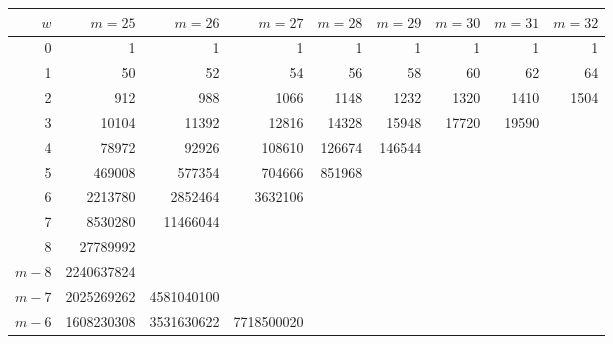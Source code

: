\documentclass[journal, twocol]{IEEEtran}
\begin{document}
\begin{table}
\centering
\footnotesize
\begin{tabular}{|@{\hskip.08cm}r@{\hskip.08cm}||@{\hskip.08cm}r@{\hskip.08cm}|@{\hskip.08cm}r@{\hskip.08cm}|@{\hskip.08cm}r@{\hskip.08cm}|@{\hskip.08cm}r@{\hskip.08cm}|@{\hskip.08cm}r@{\hskip.08cm}|@{\hskip.08cm}r@{\hskip.08cm}|@{\hskip.08cm}r@{\hskip.08cm}|@{\hskip.08cm}r@{\hskip.08cm}|}
\hline
$w$        &$m=25$      & $m=26$     & $m=27$     & $m=28$      & $m=29$      & $m=30$      & $m=31$      & $m=32$     \\\hline\hline
0          & 1          & 1          & 1          & 1           & 1           & 1           & 1           & 1          \\\hline
1          & 50         & 52         & 54         & 56          & 58          & 60          & 62          & 64         \\\hline
2          & 912        & 988        & 1066       & 1148        & 1232        & 1320        & 1410        & 1504       \\\hline
3          & 10104      & 11392      & 12816      & 14328       & 15948       & 17720       & 19590       &            \\\hline
4          & 78972      & 92926      & 108610     & 126674      & 146544      &             &             &            \\\hline
5          & 469008     & 577354     & 704666     & 851968      &             &             &             &             \\\hline
6          & 2213780    & 2852464    & 3632106    &             &             &             &             &             \\\hline
7          & 8530280    & 11466044   &            &             &             &             &             &             \\\hline
8          & 27789992   &            &            &             &             &             &             &             \\\hline
$m\!-\!8$  & 2240637824 &            &            &             &             &             &             &             \\\hline
$m\!-\!7$  & 2025269262 & 4581040100 &            &             &             &             &             &             \\\hline
$m\!-\!6$  & 1608230308 & 3531630622 & 7718500020 &             &             &             &             &             \\\hline

\end{tabular}
\end{table}
\end{document}
